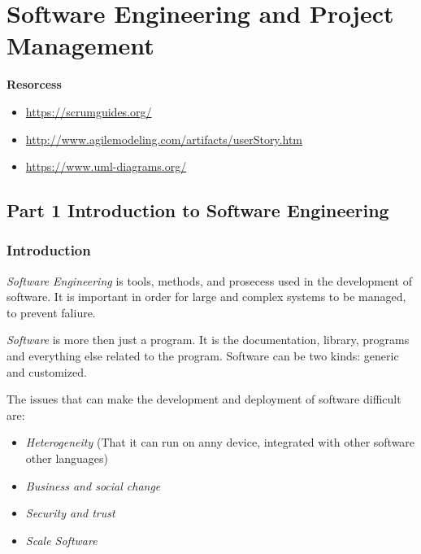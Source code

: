 \chapter{Software Engineering and Project Management}

\textbf{Resorcess}
\begin{itemize}
    \item \url{https://scrumguides.org/}
    \item \url{http://www.agilemodeling.com/artifacts/userStory.htm}
    \item \url{https://www.uml-diagrams.org/}
\end{itemize}


\section{Part 1 Introduction to Software Engineering}
\subsection{Introduction}
\textit{Software Engineering} is tools, methods, and prosecess used in the development of software.
It is important in order for large and complex systems to be managed, to prevent faliure.

\textit{Software} is more then just a program. It is the documentation, library, programs
and everything else related to the program. Software can be two kinds: generic and customized. 

The issues that can make the development and deployment of software difficult are: 
\begin{itemize}
	\item \textit{Heterogeneity} (That it can run on anny device, integrated with other software other languages)
	\item \textit{Business and social change}
	\item \textit{Security and trust}
	\item \textit{Scale Software}
\end{itemize}


